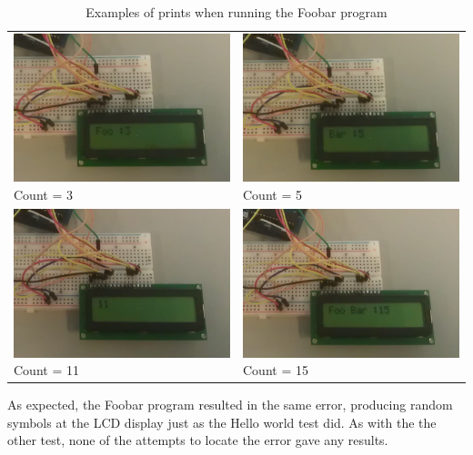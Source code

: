 \begin{table}[h]
\begin{tabular}{p{}p{}}
\includegraphics[width=8cm]{billeder/test_foobar_1.jpg}
Count = 3
 &
\includegraphics[width=8cm]{billeder/test_foobar_2.jpg}
Count = 5
\\ 
\includegraphics[width=8cm]{billeder/test_foobar_3.jpg}
Count = 11
 & 
\includegraphics[width=8cm]{billeder/test_foobar_4.jpg}
Count = 15
 \\ 
\end{tabular} 
\caption{Examples of prints when running the Foobar program}
\end{table}

As expected, the Foobar program resulted in the same error, producing random symbols at the LCD display just as the Hello world test did. As with the the other test, none of the attempts to locate the error gave any results.